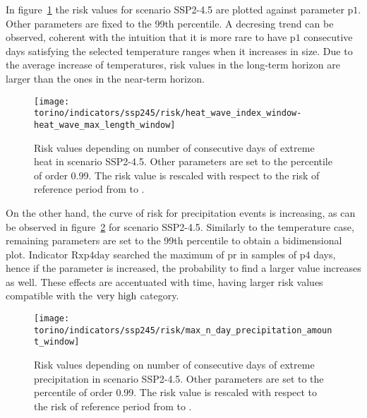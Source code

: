 In figure~\ref{fig:ssp245_risk_heat_wave_index_window-heat_wave_max_length_window} the risk values for scenario SSP2-4.5 are plotted against parameter $\mathrm{p1}$. Other parameters are fixed to the 99th percentile. A decresing trend can be observed, coherent with the intuition that it is more rare to have $\mathrm{p1}$ consecutive days satisfying the selected temperature ranges when it increases in size. Due to the average increase of temperatures, risk values in the long-term horizon are larger than the ones in the near-term horizon.

\begin{figure}[h]
  \centering
  \texttt{[image: torino/indicators/ssp245/risk/heat\_wave\_index\_window-heat\_wave\_max\_length\_window]}
  \caption{Risk values depending on number of consecutive days of extreme heat in scenario SSP2-4.5. Other parameters are set to the percentile of order 0.99. The risk value is rescaled with respect to the risk of reference period from  to .}
  \label{fig:ssp245_risk_heat_wave_index_window-heat_wave_max_length_window}
\end{figure}

On the other hand, the curve of risk for precipitation events is increasing, as can be observed in figure~\ref{fig:ssp245_risk_max_n_day_precipitation_amount_window} for scenario SSP2-4.5. Similarly to the temperature case, remaining parameters are set to the 99th percentile to obtain a bidimensional plot. Indicator $\mathrm{Rxp4day}$ searched the maximum of \gls{pr} in samples of $\mathrm{p4}$ days, hence if the parameter is increased, the probability to find a larger value increases as well. These effects are accentuated with time, having larger risk values compatible with the $\text{very high}$ category.

\begin{figure}[h]
  \centering
  \texttt{[image: torino/indicators/ssp245/risk/max\_n\_day\_precipitation\_amount\_window]}
  \caption{Risk values depending on number of consecutive days of extreme precipitation in scenario SSP2-4.5. Other parameters are set to the percentile of order 0.99. The risk value is rescaled with respect to the risk of reference period from  to .}
  \label{fig:ssp245_risk_max_n_day_precipitation_amount_window}
\end{figure}

